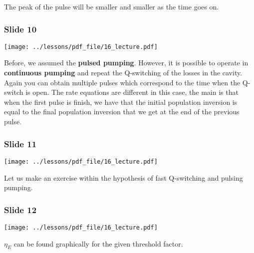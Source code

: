 \documentclass[../main/main.tex]{subfiles}
\begin{document}
The peak of the pulse will be smaller and smaller as the time goes on.

\subsubsection*{Slide 10}

\begin{minipage}[]{0.5\linewidth}
\centering
\texttt{[image: ../lessons/pdf\_file/16\_lecture.pdf]}
\end{minipage}
\hspace{0.3cm}\vspace{0.3cm}
\begin{minipage}[c]{0.47\linewidth}

Before, we assumed the \textbf{pulsed pumping}. However, it is possible to operate in \textbf{continuous pumping} and repeat the Q-switching of the losses in the cavity. Again you can obtain multiple pulses which correspond to the time when the Q-switch is open. The rate equations are different in this case, the main is that when the first pulse is finish, we have that the initial population inversion is equal to the final population inversion that we get at the end of the previous pulse.

\end{minipage}

\subsubsection*{Slide 11}

\begin{minipage}[]{0.5\linewidth}
\centering
\texttt{[image: ../lessons/pdf\_file/16\_lecture.pdf]}
\end{minipage}
\hspace{0.3cm}\vspace{0.3cm}
\begin{minipage}[c]{0.47\linewidth}

Let us make an exercise within the hypothesis of fast Q-switching and pulsing pumping.

\end{minipage}

\subsubsection*{Slide 12}

\begin{minipage}[]{0.5\linewidth}
\centering
\texttt{[image: ../lessons/pdf\_file/16\_lecture.pdf]}
\end{minipage}
\hspace{0.3cm}\vspace{0.3cm}
\begin{minipage}[c]{0.47\linewidth}

\( \eta _E \) can be found graphically for the given threshold factor.

\end{minipage}
\end{document}
